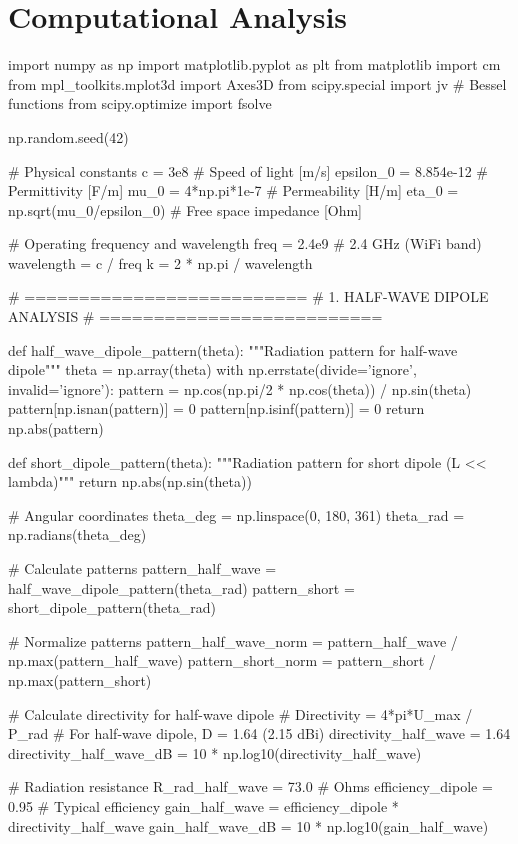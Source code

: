 \documentclass[a4paper, 11pt]{article}
\begin{document}
\section{Computational Analysis}

\begin{pycode}
import numpy as np
import matplotlib.pyplot as plt
from matplotlib import cm
from mpl_toolkits.mplot3d import Axes3D
from scipy.special import jv  # Bessel functions
from scipy.optimize import fsolve

np.random.seed(42)

# Physical constants
c = 3e8  # Speed of light [m/s]
epsilon_0 = 8.854e-12  # Permittivity [F/m]
mu_0 = 4*np.pi*1e-7  # Permeability [H/m]
eta_0 = np.sqrt(mu_0/epsilon_0)  # Free space impedance [Ohm]

# Operating frequency and wavelength
freq = 2.4e9  # 2.4 GHz (WiFi band)
wavelength = c / freq
k = 2 * np.pi / wavelength

# ==========================
# 1. HALF-WAVE DIPOLE ANALYSIS
# ==========================

def half_wave_dipole_pattern(theta):
    """Radiation pattern for half-wave dipole"""
    theta = np.array(theta)
    with np.errstate(divide='ignore', invalid='ignore'):
        pattern = np.cos(np.pi/2 * np.cos(theta)) / np.sin(theta)
        pattern[np.isnan(pattern)] = 0
        pattern[np.isinf(pattern)] = 0
    return np.abs(pattern)

def short_dipole_pattern(theta):
    """Radiation pattern for short dipole (L << lambda)"""
    return np.abs(np.sin(theta))

# Angular coordinates
theta_deg = np.linspace(0, 180, 361)
theta_rad = np.radians(theta_deg)

# Calculate patterns
pattern_half_wave = half_wave_dipole_pattern(theta_rad)
pattern_short = short_dipole_pattern(theta_rad)

# Normalize patterns
pattern_half_wave_norm = pattern_half_wave / np.max(pattern_half_wave)
pattern_short_norm = pattern_short / np.max(pattern_short)

# Calculate directivity for half-wave dipole
# Directivity = 4*pi*U_max / P_rad
# For half-wave dipole, D = 1.64 (2.15 dBi)
directivity_half_wave = 1.64
directivity_half_wave_dB = 10 * np.log10(directivity_half_wave)

# Radiation resistance
R_rad_half_wave = 73.0  # Ohms
efficiency_dipole = 0.95  # Typical efficiency
gain_half_wave = efficiency_dipole * directivity_half_wave
gain_half_wave_dB = 10 * np.log10(gain_half_wave)


\end{pycode}
\end{document}
